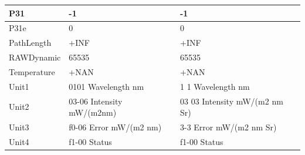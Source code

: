 \documentclass[10pt, a4paper]{article}
\begin{document}
\begin{appendices}
\begin{table}[H]
\begin{tabular}{| p{3cm} | p{3cm} | p{5cm} |}
		    P31 & -1 & -1 \\ \hline
		   P31e & 0 & 0 \\ \hline
		   PathLength & +INF & +INF \\ \hline
		   RAWDynamic & 65535 & 65535 \\ \hline
		   Temperature & +NAN & +NAN \\ \hline
		   Unit1 & 0101 Wavelength nm &  1 1 Wavelength nm \\ \hline
		   Unit2 & 03-06 Intensity mW/(m2nm) & 03 03 Intensity mW/(m2 nm Sr) \\ \hline
		   Unit3 & f0-06 Error mW/(m2 nm) & 3-3 Error mW/(m2 nm Sr) \\ \hline
		  Unit4 & f1-00 Status & f1-00 Status \\ \hline
	  \end{tabular}	
\end{table}
\pagebreak


\end{appendices}
\end{document}
